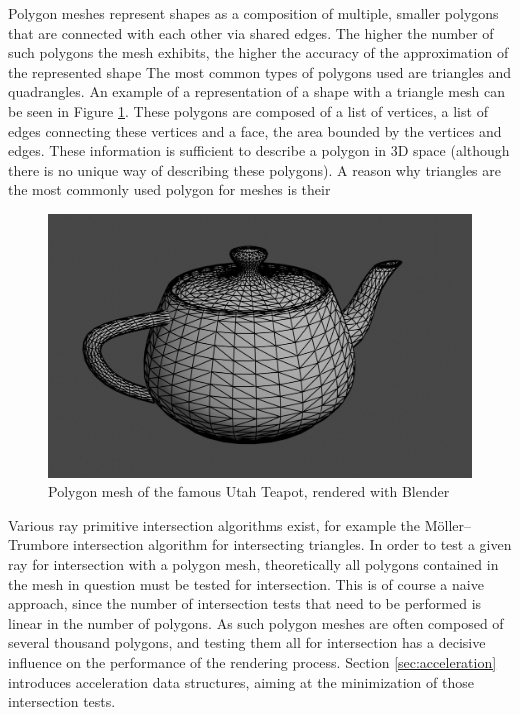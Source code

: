 Polygon meshes represent shapes as a composition of multiple, smaller polygons that are connected with each other via shared edges. The higher the number of such polygons the mesh exhibits, the higher the accuracy of the approximation of the represented shape  The most common types of polygons used are triangles and quadrangles. An example of a representation of a shape with a triangle mesh can be seen in Figure \ref{fig:poly_mesh}. These polygons are composed of a list of vertices, a list of edges connecting these vertices and a face, the area bounded by the vertices and edges. These information is sufficient to describe a polygon in 3D space (although there is no unique way of describing these polygons). A reason why triangles are the most commonly used polygon for meshes is their


\begin{figure}
	\centering
	\includegraphics[width=.8\linewidth]{img/1 fundamentals/poly_mesh.png}
	\caption{Polygon mesh of the famous Utah Teapot, rendered with Blender \cite{blender2018}}
	\label{fig:poly_mesh}
\end{figure}

Various ray primitive intersection algorithms exist, for example the Möller– Trumbore intersection algorithm \cite{moller1997fast} for intersecting triangles. In order to test a given ray for intersection with a polygon mesh, theoretically all polygons contained in the mesh in question must be tested for intersection. This is of course a naive approach, since the number of intersection tests that need to be performed is linear in the number of polygons. As such polygon meshes are often composed of several thousand polygons, and testing them all for intersection has a decisive influence on the performance of the rendering process. Section \ref{sec:acceleration} introduces acceleration data structures, aiming at the minimization of those intersection tests.

